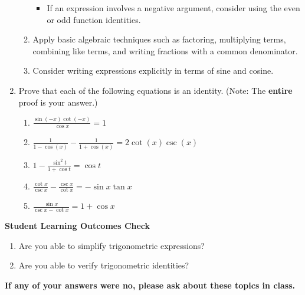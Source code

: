 \begin{enumerate}
\begin{boxthm}
\begin{enumerate}
\begin{itemize}
\item If an expression involves a negative argument, consider using the even or odd function identities.

\end{itemize}

\item Apply basic algebraic techniques such as factoring, multiplying terms, combining like terms, and writing fractions with a common denominator.

\item Consider writing expressions explicitly in terms of sine and cosine.

\end{enumerate}

\end{boxthm}

\newpage

\item Prove that each of the following equations is an identity. (Note: The {\bf entire} proof is your answer.)
\begin{enumerate}
\item $\displaystyle \frac{\sin(-x)\cot(-x)}{\cos x} = 1$
\vfill

\item $\displaystyle \frac{1}{1-\cos (x)}-\frac{1}{1+\cos (x)} = 2\cot (x)\csc (x)$
\vfill
\vfill
\newpage

\item $\displaystyle 1 - \frac{\sin^2 t}{1+\cos t} = \cos t$
\vfill

\item $\displaystyle \frac{\cot x}{\csc x}-\frac{\csc x}{\cot x} = -\sin x \tan x$
\vfill

\newpage


\item $\displaystyle \frac{\sin x}{\csc x - \cot x} = 1+\cos x$
\vfill


\end{enumerate}


\end{enumerate}
\vfill
\noindent \textbf{Student Learning Outcomes Check}

\begin{enumerate}
\item Are you able to simplify trigonometric expressions?
\item Are you able to verify trigonometric identities?

\end{enumerate}

\noindent \textbf{If any of your answers were no, please ask about these topics in class.}

